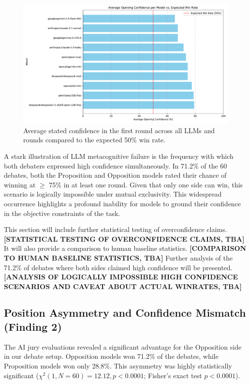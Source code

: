 \documentclass{article}
\begin{document}
\begin{figure}[h]
  \centering
  \includegraphics[width=0.8\linewidth]{figures/model_avg_opening_confidence_bar_chart.pdf}
  \caption{Average stated confidence in the first round across all LLMs and rounds compared to the expected 50\% win rate.}
  \label{fig:avg_confidence}
\end{figure}

A stark illustration of LLM metacognitive failure is the frequency with which both debaters expressed high confidence simultaneously. In 71.2\% of the 60 debates, both the Proposition and Opposition models rated their chance of winning at $\ge$ 75\% in at least one round. Given that only one side can win, this scenario is logically impossible under mutual exclusivity. This widespread occurrence highlights a profound inability for models to ground their confidence in the objective constraints of the task.

This section will include further statistical testing of overconfidence claims. \textbf{[STATISTICAL TESTING OF OVERCONFIDENCE CLAIMS, TBA]}
It will also provide a comparison to human baseline statistics. \textbf{[COMPARISON TO HUMAN BASELINE STATISTICS, TBA]}
Further analysis of the 71.2\% of debates where both sides claimed high confidence will be presented. \textbf{[ANALYSIS OF LOGICALLY IMPOSSIBLE HIGH CONFIDENCE SCENARIOS AND CAVEAT ABOUT ACTUAL WINRATES, TBA]}

\subsection{Position Asymmetry and Confidence Mismatch (Finding 2)}

The AI jury evaluations revealed a significant advantage for the Opposition side in our debate setup. Opposition models won 71.2\% of the debates, while Proposition models won only 28.8\%. This asymmetry was highly statistically significant ($\chi^2(1, N=60) = 12.12, p < 0.0001$; Fisher's exact test $p < 0.0001$).
\end{document}
